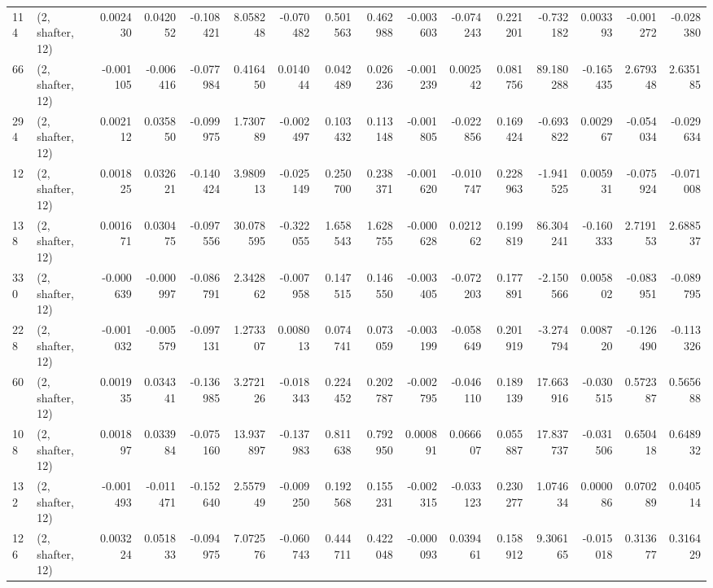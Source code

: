 \begin{tabular}{llrrrrrrrrrrrrrr}
114 &  (2, shafter, 12) &   0.002430 &  0.042052 & -0.108421 &     8.058248 &  -0.070482 &   0.501563 &   0.462988 & -0.003603 & -0.074243 &  0.221201 &   -0.732182 &  0.003393 & -0.001272 & -0.028380 \\
66  &  (2, shafter, 12) &  -0.001105 & -0.006416 & -0.077984 &     0.416450 &   0.014044 &   0.042489 &   0.026236 & -0.001239 &  0.002542 &  0.081756 &   89.180288 & -0.165435 &  2.679348 &  2.635185 \\
294 &  (2, shafter, 12) &   0.002112 &  0.035850 & -0.099975 &     1.730789 &  -0.002497 &   0.103432 &   0.113148 & -0.001805 & -0.022856 &  0.169424 &   -0.693822 &  0.002967 & -0.054034 & -0.029634 \\
12  &  (2, shafter, 12) &   0.001825 &  0.032621 & -0.140424 &     3.980913 &  -0.025149 &   0.250700 &   0.238371 & -0.001620 & -0.010747 &  0.228963 &   -1.941525 &  0.005931 & -0.075924 & -0.071008 \\
138 &  (2, shafter, 12) &   0.001671 &  0.030475 & -0.097556 &    30.078595 &  -0.322055 &   1.658543 &   1.628755 & -0.000628 &  0.021262 &  0.199819 &   86.304241 & -0.160333 &  2.719153 &  2.688537 \\
330 &  (2, shafter, 12) &  -0.000639 & -0.000997 & -0.086791 &     2.342862 &  -0.007958 &   0.147515 &   0.146550 & -0.003405 & -0.072203 &  0.177891 &   -2.150566 &  0.005802 & -0.083951 & -0.089795 \\
228 &  (2, shafter, 12) &  -0.001032 & -0.005579 & -0.097131 &     1.273307 &   0.008013 &   0.074741 &   0.073059 & -0.003199 & -0.058649 &  0.201919 &   -3.274794 &  0.008720 & -0.126490 & -0.113326 \\
60  &  (2, shafter, 12) &   0.001935 &  0.034341 & -0.136985 &     3.272126 &  -0.018343 &   0.224452 &   0.202787 & -0.002795 & -0.046110 &  0.189139 &   17.663916 & -0.030515 &  0.572387 &  0.565688 \\
108 &  (2, shafter, 12) &   0.001897 &  0.033984 & -0.075160 &    13.937897 &  -0.137983 &   0.811638 &   0.792950 &  0.000891 &  0.066607 &  0.055887 &   17.837737 & -0.031506 &  0.650418 &  0.648932 \\
132 &  (2, shafter, 12) &  -0.001493 & -0.011471 & -0.152640 &     2.557949 &  -0.009250 &   0.192568 &   0.155231 & -0.002315 & -0.033123 &  0.230277 &    1.074634 &  0.000086 &  0.070289 &  0.040514 \\
126 &  (2, shafter, 12) &   0.003224 &  0.051833 & -0.094975 &     7.072576 &  -0.060743 &   0.444711 &   0.422048 & -0.000093 &  0.039461 &  0.158912 &    9.306165 & -0.015018 &  0.313677 &  0.316429 \\

\end{tabular}
